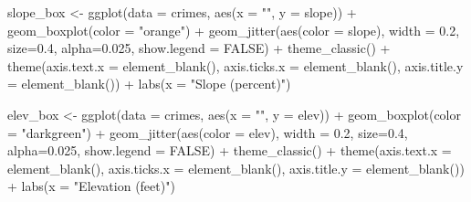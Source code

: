 \documentclass[
]{article}
\newenvironment{Shaded}{\begin{snugshade}}{\end{snugshade}}
\newcommand{\AttributeTok}[1]{\textcolor[rgb]{0.77,0.63,0.00}{#1}}
\newcommand{\ConstantTok}[1]{\textcolor[rgb]{0.00,0.00,0.00}{#1}}
\newcommand{\FloatTok}[1]{\textcolor[rgb]{0.00,0.00,0.81}{#1}}
\newcommand{\FunctionTok}[1]{\textcolor[rgb]{0.00,0.00,0.00}{#1}}
\newcommand{\NormalTok}[1]{#1}
\newcommand{\OtherTok}[1]{\textcolor[rgb]{0.56,0.35,0.01}{#1}}
\newcommand{\SpecialCharTok}[1]{\textcolor[rgb]{0.00,0.00,0.00}{#1}}
\newcommand{\StringTok}[1]{\textcolor[rgb]{0.31,0.60,0.02}{#1}}
\begin{document}
\begin{Shaded}
\begin{Highlighting}[]
\NormalTok{slope\_box }\OtherTok{\textless{}{-}} \FunctionTok{ggplot}\NormalTok{(}\AttributeTok{data =}\NormalTok{ crimes, }\FunctionTok{aes}\NormalTok{(}\AttributeTok{x =} \StringTok{""}\NormalTok{, }\AttributeTok{y =}\NormalTok{ slope)) }\SpecialCharTok{+}
  \FunctionTok{geom\_boxplot}\NormalTok{(}\AttributeTok{color =} \StringTok{"orange"}\NormalTok{) }\SpecialCharTok{+}
  \FunctionTok{geom\_jitter}\NormalTok{(}\FunctionTok{aes}\NormalTok{(}\AttributeTok{color =}\NormalTok{ slope), }
              \AttributeTok{width =} \FloatTok{0.2}\NormalTok{,}
              \AttributeTok{size=}\FloatTok{0.4}\NormalTok{, }
              \AttributeTok{alpha=}\FloatTok{0.025}\NormalTok{, }
              \AttributeTok{show.legend =} \ConstantTok{FALSE}\NormalTok{) }\SpecialCharTok{+}
  \FunctionTok{theme\_classic}\NormalTok{() }\SpecialCharTok{+}
  \FunctionTok{theme}\NormalTok{(}\AttributeTok{axis.text.x =} \FunctionTok{element\_blank}\NormalTok{(),}
        \AttributeTok{axis.ticks.x =} \FunctionTok{element\_blank}\NormalTok{(),}
        \AttributeTok{axis.title.y =} \FunctionTok{element\_blank}\NormalTok{()) }\SpecialCharTok{+}
  \FunctionTok{labs}\NormalTok{(}\AttributeTok{x =} \StringTok{"Slope (percent)"}\NormalTok{)}

\NormalTok{elev\_box }\OtherTok{\textless{}{-}} \FunctionTok{ggplot}\NormalTok{(}\AttributeTok{data =}\NormalTok{ crimes, }\FunctionTok{aes}\NormalTok{(}\AttributeTok{x =} \StringTok{""}\NormalTok{, }\AttributeTok{y =}\NormalTok{ elev)) }\SpecialCharTok{+}
  \FunctionTok{geom\_boxplot}\NormalTok{(}\AttributeTok{color =} \StringTok{"darkgreen"}\NormalTok{) }\SpecialCharTok{+}
  \FunctionTok{geom\_jitter}\NormalTok{(}\FunctionTok{aes}\NormalTok{(}\AttributeTok{color =}\NormalTok{ elev), }
              \AttributeTok{width =} \FloatTok{0.2}\NormalTok{,}
              \AttributeTok{size=}\FloatTok{0.4}\NormalTok{, }
              \AttributeTok{alpha=}\FloatTok{0.025}\NormalTok{, }
              \AttributeTok{show.legend =} \ConstantTok{FALSE}\NormalTok{) }\SpecialCharTok{+}
  \FunctionTok{theme\_classic}\NormalTok{() }\SpecialCharTok{+}
  \FunctionTok{theme}\NormalTok{(}\AttributeTok{axis.text.x =} \FunctionTok{element\_blank}\NormalTok{(),}
        \AttributeTok{axis.ticks.x =} \FunctionTok{element\_blank}\NormalTok{(),}
        \AttributeTok{axis.title.y =} \FunctionTok{element\_blank}\NormalTok{()) }\SpecialCharTok{+}
  \FunctionTok{labs}\NormalTok{(}\AttributeTok{x =} \StringTok{"Elevation (feet)"}\NormalTok{)}


\end{Highlighting}
\end{Shaded}
\end{document}

